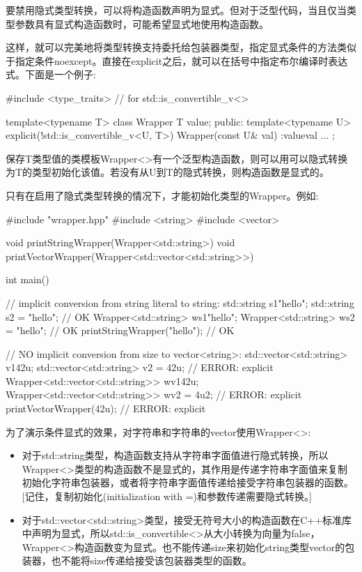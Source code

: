 
要禁用隐式类型转换，可以将构造函数声明为显式。但对于泛型代码，当且仅当类型参数具有显式构造函数时，可能希望显式地使用构造函数。

这样，就可以完美地将类型转换支持委托给包装器类型，指定显式条件的方法类似于指定条件noexcept。直接在explicit之后，就可以在括号中指定布尔编译时表达式。下面是一个例子:


\begin{cpp}
#include <type_traits> // for std::is_convertible_v<>

template<typename T>
class Wrapper {
	T value;
public:
	template<typename U>
	explicit(!std::is_convertible_v<U, T>)
	Wrapper(const U& val)
	:value{val} {
	}
	...
};
\end{cpp}

保存T类型值的类模板Wrapper<>有一个泛型构造函数，则可以用可以隐式转换为T的类型初始化该值。若没有从U到T的隐式转换，则构造函数是显式的。

只有在启用了隐式类型转换的情况下，才能初始化类型的Wrapper。例如:


\begin{cpp}
#include "wrapper.hpp"
#include <string>
#include <vector>

void printStringWrapper(Wrapper<std::string>) {
}
void printVectorWrapper(Wrapper<std::vector<std::string>>) {
}

int main()
{
	// implicit conversion from string literal to string:
	std::string s1{"hello"};
	std::string s2 = "hello"; // OK
	Wrapper<std::string> ws1{"hello"};
	Wrapper<std::string> ws2 = "hello"; // OK
	printStringWrapper("hello"); // OK

	// NO implicit conversion from size to vector<string>:
	std::vector<std::string> v1{42u};
	std::vector<std::string> v2 = 42u; // ERROR: explicit
	Wrapper<std::vector<std::string>> wv1{42u};
	Wrapper<std::vector<std::string>> wv2 = 4u2; // ERROR: explicit
	printVectorWrapper(42u); // ERROR: explicit
}
\end{cpp}

为了演示条件显式的效果，对字符串和字符串的vector使用Wrapper<>:

\begin{itemize}
\item
对于std::string类型，构造函数支持从字符串字面值进行隐式转换，所以Wrapper<>类型的构造函数不是显式的，其作用是传递字符串字面值来复制初始化字符串包装器，或者将字符串字面值传递给接受字符串包装器的函数。[记住，复制初始化(initialization with =)和参数传递需要隐式转换。]

\item
对于std::vector<std::string>类型，接受无符号大小的构造函数在C++标准库中声明为显式，所以std::is\_convertible<>从大小转换为向量为false，Wrapper<>构造函数变为显式。也不能传递size来初始化string类型vector的包装器，也不能将size传递给接受该包装器类型的函数。
\end{itemize}

